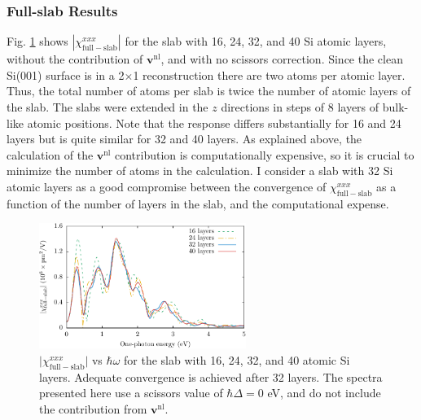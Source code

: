 
\subsubsection{Full-slab Results}\label{sec:fsresults}

Fig. \ref{fig:layersconv} shows $|\chi_{\mathrm{full-slab}}^{xxx}|$ for the slab
with 16, 24, 32, and 40 Si atomic layers, without the contribution of
$\mathbf{v}^{\mathrm{nl}}$, and with no scissors correction. Since the clean
Si(001) surface is in a 2$\times$1 reconstruction there are two atoms per atomic
layer. Thus, the total number of atoms per slab is twice the number of atomic
layers of the slab. The slabs were extended in the $z$ directions in steps of 8
layers of bulk-like atomic positions. Note that the response differs
substantially for 16 and 24 layers but is quite similar for 32 and 40 layers. As
explained above, the calculation of the $\mathbf{v}^\mathrm{nl}$ contribution is
computationally expensive, so it is crucial to minimize the number of atoms in
the calculation. I consider a slab with 32 Si atomic layers as a good compromise
between the convergence of $\chi^{xxx}_{\mathrm{full-slab}}$ as a function of
the number of layers in the slab, and the computational expense.

\begin{figure}[t]
\centering 
\includegraphics[width=0.6\textwidth]{content/figures/fig-Si2x1-layerconv}
\caption[Layer convergence for the Si(001)(2$\times$1) slab.]
{$\vert\chi_{\mathrm{full-slab}}^{xxx}\vert$ vs $\hbar\omega$ for the
slab with 16, 24, 32, and 40 atomic Si layers. Adequate convergence is achieved
after 32 layers. The spectra presented here use a scissors value of $\hbar\Delta
= 0$ eV, and do not include the contribution from $\mathbf{v}^{\mathrm{nl}}$.}
\label{fig:layersconv}
\end{figure}



